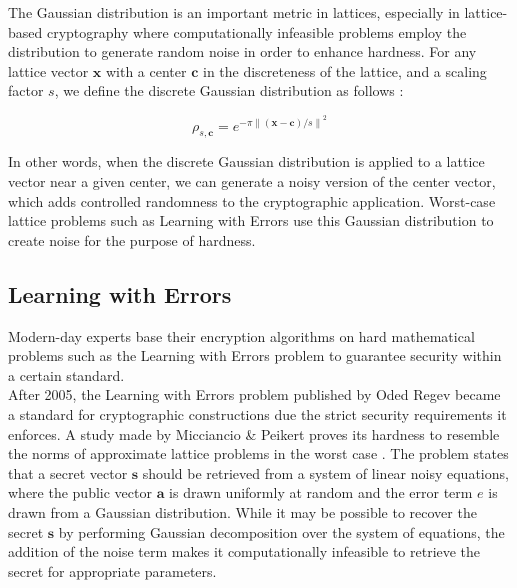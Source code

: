 \documentclass[11pt,
  titlepage=false,
  abstract=on,
]{scrreprt}
\begin{document}
The Gaussian distribution is an important metric in lattices, especially in lattice-based cryptography where computationally infeasible problems employ the distribution
to generate random noise in order to enhance hardness. For any lattice vector $\mathbf{x}$ with a center $\mathbf{c}$ in the discreteness of the lattice, and a scaling factor $s$,
we define the discrete Gaussian distribution as follows \cite{WCToAVGCase}:

\begin{equation*}
  \rho_{s,\mathbf{c}} = e^{-\pi {\| (\mathbf{x} - \mathbf{c}) / s\|}^2}
\end{equation*}

In other words, when the discrete Gaussian distribution is applied to a lattice vector near a given center, we can generate a noisy version of the center vector, which adds controlled randomness 
to the cryptographic application. Worst-case lattice problems such as Learning with Errors use this Gaussian distribution to create noise for the purpose of hardness.

\subsection{Learning with Errors}
Modern-day experts base their encryption algorithms on hard mathematical problems such as the Learning with Errors problem to guarantee security within a certain standard.\\
After 2005, the Learning with Errors problem published by Oded Regev \cite{regev2010learning} became a standard for cryptographic constructions due the strict security requirements it enforces.
A study made by Micciancio \& Peikert proves its hardness to resemble the norms of approximate lattice problems in the worst case \cite{micciancio2013hardness}.
The problem states that a secret vector $\textbf{s}$ should be retrieved from a system of linear noisy equations, where the public vector $\textbf{a}$ is drawn uniformly at random
and the error term $\textit{e}$ is drawn from a Gaussian distribution. While it may be possible to recover the secret $\textbf{s}$
by performing Gaussian decomposition over the system of equations, the addition of the noise term makes it computationally infeasible to retrieve the
secret for appropriate parameters.
\end{document}
